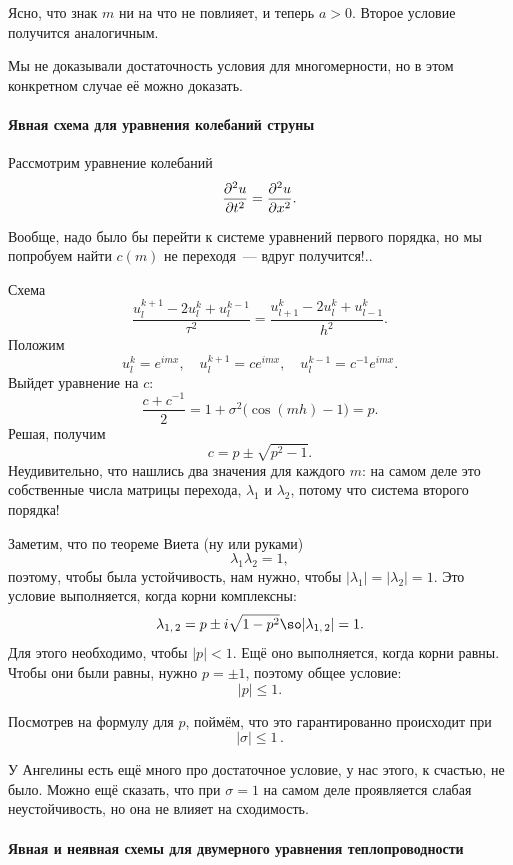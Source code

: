 \documentclass{trlnotes}
\begin{document}
	Ясно, что знак $m$ ни на что не повлияет, и теперь $a > 0$. Второе условие получится аналогичным.

	\begin{rem}
		Мы не доказывали достаточность условия для многомерности, но в этом конкретном случае её можно доказать.
	\end{rem}

	\paragraph{Явная схема для уравнения колебаний струны}

	Рассмотрим уравнение колебаний
	\[
		\dfrac{\partial^2 u}{\partial t^2} = \dfrac{\partial^2 u}{\partial x^2}.
	\]

	Вообще, надо было бы перейти к системе уравнений первого порядка, но мы попробуем найти $c(m)$ не переходя~--- вдруг получится!..

	Схема
	\[
		\dfrac{u_l^{k + 1} - 2u_l^k + u_l^{k-1}}{\tau^2} = \dfrac{u^k_{l+1} - 2u^k_l + u^k_{l-1}}{h^2}.
	\]
	Положим
	\[
		u_l^k = e^{imx}, \quad u_l^{k+1} = ce^{imx}, \quad u_l^{k-1} = c^{-1} e^{imx}.
	\]
	Выйдет уравнение на $c$:
	\[
		\dfrac{c + c^{-1}}{2} = 1 + \sigma^2\big(\cos(mh) - 1\big) = p.
	\]
	Решая, получим
	\[
		c = p \pm \sqrt{p^2 - 1}.
	\]
	Неудивительно, что нашлись два значения для каждого $m$: на самом деле это собственные числа матрицы перехода, $\lambda_1$ и $\lambda_2$, потому что система второго порядка!

	Заметим, что по теореме Виета (ну или руками) 
	\[
		\lambda_1 \lambda_2 = 1,
	\]
	поэтому, чтобы была устойчивость, нам нужно, чтобы $|\lambda_1| = |\lambda_2| = 1$. Это условие выполняется, когда корни комплексны:
	\[
		\lambda_{1, \, 2} = p \pm i\sqrt{1 - p^2} \so |\lambda_{1, \, 2}| = 1.
	\]
	Для этого необходимо, чтобы $|p| < 1$. Ещё оно выполняется, когда корни равны. Чтобы они были равны, нужно $p = \pm 1$, поэтому общее условие:
	\[
		|p| \leqslant 1.
	\]

	Посмотрев на формулу для $p$, поймём, что это гарантированно происходит при 
	\[
		\boxed{|\sigma| \leqslant 1}\,.
	\]

	\begin{rem}
		У Ангелины есть ещё много про достаточное условие, у нас этого, к счастью, не было. Можно ещё сказать, что при $\sigma = 1$ на самом деле проявляется слабая неустойчивость, но она не влияет на сходимость.
	\end{rem}

	\paragraph{Явная и неявная схемы для двумерного уравнения теплопроводности}
\end{document}
